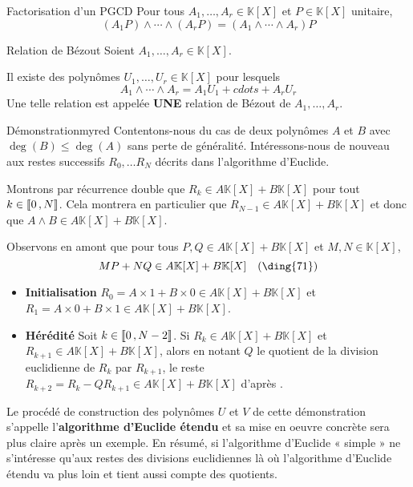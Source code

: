     \begin{theo}{Factorisation d’un PGCD}{}
        Pour tous $A_1,\ldots,A_r \in \mathbb{K}[X]$ et $P \in \mathbb{K}[X]$ unitaire, 
        \[ (A_1 P) \wedge \cdots \wedge (A_r P) = (A_1 \wedge \cdots \wedge A_r) P \]
    \end{theo}

    \begin{theo}{Relation de Bézout}{}
        Soient $A_1,\ldots, A_r \in \mathbb{K}[X]$. 

        Il existe des polynômes $U_1,\ldots,U_r \in \mathbb{K}[X]$ pour lesquels 
        \[ A_1 \wedge \cdots \wedge A_r = A_1 U_1 + cdots + A_r U_r \]   
        Une telle relation est appelée \textbf{\textsc{UNE}} relation de Bézout de $A_1,\ldots,A_r$.
    \end{theo}

    \begin{demo}{Démonstration}{myred}
        Contentons-nous du cas de deux polynômes $A$ et $B$ avec $\deg(B) \leq \deg(A)$ sans perte de généralité. Intéressons-nous de nouveau aux restes successifs $R_0, \ldots R_N$ décrits dans l’algorithme d’Euclide. 

        Montrons par récurrence double que $R_k \in A \mathbb{K}[X] + B \mathbb{K}[X]$ pour tout $k \in \left\llbracket 0 \, , N \right\rrbracket$. Cela montrera en particulier que $R_{N-1} \in A \mathbb{K}[X] + B \mathbb{K}[X]$ et donc que $A \wedge B \in A \mathbb{K}[X] + B \mathbb{K}[X]$.

        Observons en amont que pour tous $P,Q \in A \mathbb{K}[X] + B \mathbb{K}[X]$ et $M,N \in \mathbb{K}[X]$, 
        \[MP + NQ \in A \mathbb{K}[X] + B \mathbb{K}[X] \eqlabel{\ding{71}}\]
        \begin{itemize}
            \item \textbf{Initialisation} \quad $R_0 = A \times 1 + B \times 0 \in A \mathbb{K}[X] + B \mathbb{K}[X]$ et $R_1 = A \times 0 + B \times 1 \in A \mathbb{K}[X] + B \mathbb{K}[X]$.
            \item \textbf{Hérédité} \quad Soit $k \in \left\llbracket 0 \, , N-2 \right\rrbracket$. Si $R_k \in A \mathbb{K}[X] + B \mathbb{K}[X]$ et $R_{k+1} \in A \mathbb{K}[X] + B \mathbb{K}[X]$, alors en notant $Q$ le quotient de la division euclidienne de $R_k$ par $R_{k+1}$, le reste $R_{k+2} = R_k - Q R_{k+1} \in A \mathbb{K}[X] + B \mathbb{K}[X]$ d’après .
        \end{itemize}
    \end{demo}

    Le procédé de construction des polynômes $U$ et $V$ de cette démonstration s’appelle l’\textbf{algorithme d’Euclide étendu} et sa mise en oeuvre concrète sera plus claire après un exemple. En résumé, si l’algorithme d’Euclide « simple » ne s’intéresse qu’aux restes des divisions euclidiennes là où l’algorithme d’Euclide étendu va plus loin et tient aussi compte des quotients.

